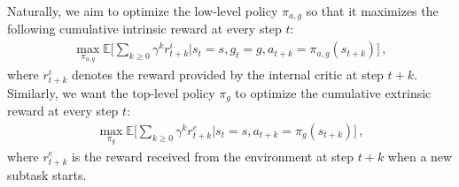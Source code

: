 \documentclass[11pt,letterpaper]{article}
\begin{document}
Naturally, we aim to optimize the low-level policy $\pi_{a,g}$ so that it maximizes the following cumulative intrinsic reward at every step $t$:
%
\begin{eqnarray*}
\max_{\pi_{a,g}} \mathbb{E}\Big[\sum_{k \ge 0} \gamma^{k}r_{t+k}^i \Big| s_t=s, g_t=g,a_{t+k}=\pi_{a,g}(s_{t+k})\Big]\,,
\end{eqnarray*}
where $r_{t+k}^i$ denotes the reward provided by the internal critic at step $t+k$.
Similarly, we want the top-level policy $\pi_g$ to optimize the cumulative extrinsic reward at every step $t$: %
\begin{eqnarray*}
\max_{\pi_g} \mathbb{E}\Big[\sum_{k \ge 0} \gamma^{k}r_{t+k}^e \Big| s_t=s, %
a_{t+k}=\pi_g(s_{t+k})\Big]\,,
\end{eqnarray*}
where $r^e_{t+k}$ is the reward received from the environment at step $t+k$ when a new subtask starts.
\end{document}
